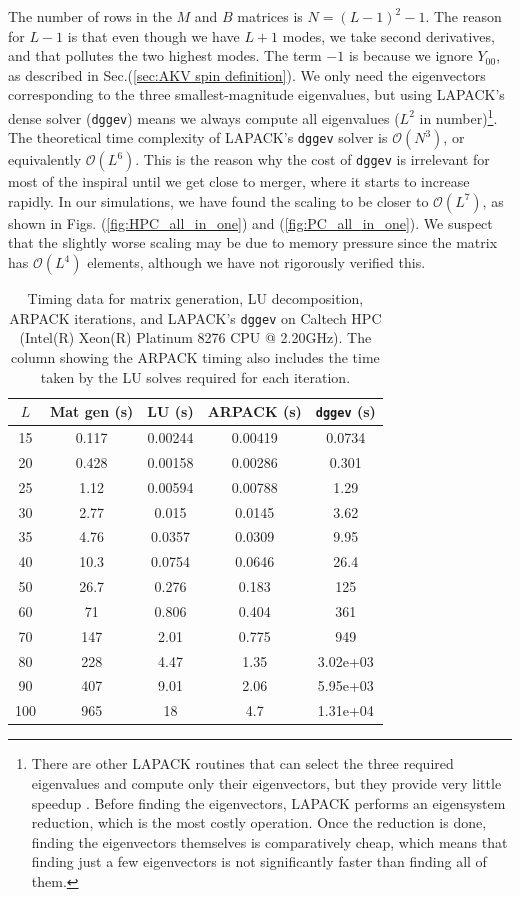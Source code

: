\documentclass{iopjournal}
\begin{document}
The number of rows in the $M$ and $B$ matrices is $N = (L-1)^2 -1$. The reason for $L-1$ is that even though we have $L+1$ modes, we take second derivatives, and that pollutes the two highest modes. The term $-1$ is because we ignore $Y_{00}$, as described in Sec.(\ref{sec:AKV spin definition}). We only need the eigenvectors corresponding to the three smallest-magnitude eigenvalues, but using LAPACK's dense solver (\texttt{dggev}) means we always compute all eigenvalues ($L^2$ in number)\footnote{There are other LAPACK routines that can select the three required eigenvalues and compute only their eigenvectors, but they provide very little speedup \cite[Sec.~3.4.3]{lapack_users_guide}. Before finding the eigenvectors, LAPACK performs an eigensystem reduction, which is the most costly operation. Once the reduction is done, finding the eigenvectors themselves is comparatively cheap, which means that finding just a few eigenvectors is not significantly faster than finding all of them.}. The theoretical time complexity of LAPACK's \texttt{dggev} solver is $\mathcal{O}(N^3)$, or equivalently $\mathcal{O}(L^6)$. This is the reason why the cost of \texttt{dggev} is irrelevant for most of the inspiral until we get close to merger, where it starts to increase rapidly. In our simulations, we have found the scaling to be closer to $\mathcal{O}(L^7)$, as shown in Figs. (\ref{fig:HPC_all_in_one}) and (\ref{fig:PC_all_in_one}). We suspect that the slightly worse scaling may be due to memory pressure since the matrix has $\mathcal{O}(L^4)$ elements, although we have not rigorously verified this.

\begin{table}[h]
\centering
\begin{tabular}{c c c c c}
\toprule
$L$ & Mat gen (s) & LU (s) & ARPACK (s) & \texttt{dggev} (s) \\
\midrule
15 & 0.117 & 0.00244 & 0.00419 & 0.0734 \\
20 & 0.428 & 0.00158 & 0.00286 & 0.301 \\
25 & 1.12 & 0.00594 & 0.00788 & 1.29 \\
30 & 2.77 & 0.015 & 0.0145 & 3.62 \\
35 & 4.76 & 0.0357 & 0.0309 & 9.95 \\
40 & 10.3 & 0.0754 & 0.0646 & 26.4 \\
50 & 26.7 & 0.276 & 0.183 & 125 \\
60 & 71 & 0.806 & 0.404 & 361 \\
70 & 147 & 2.01 & 0.775 & 949 \\
80 & 228 & 4.47 & 1.35 & 3.02e+03 \\
90 & 407 & 9.01 & 2.06 & 5.95e+03 \\
100 & 965 & 18 & 4.7 & 1.31e+04 \\
\bottomrule
\end{tabular}
\caption{Timing data for matrix generation, LU decomposition, ARPACK iterations, and LAPACK's \texttt{dggev} on Caltech HPC (Intel(R) Xeon(R) Platinum 8276 CPU @ 2.20GHz). The column showing the ARPACK timing also includes the time taken by the LU solves required for each iteration.}
\label{table:timing_data_HPC}
\end{table}
\end{document}
